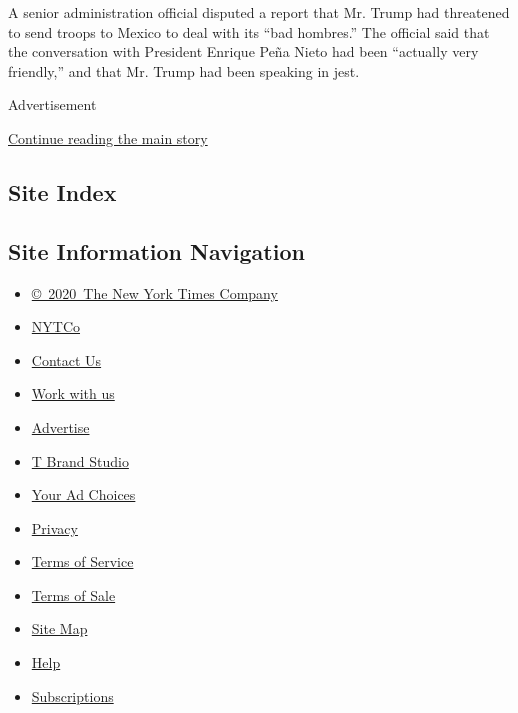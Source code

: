 A senior administration official disputed a report that Mr. Trump had
threatened to send troops to Mexico to deal with its ``bad hombres.''
The official said that the conversation with President Enrique Peña
Nieto had been ``actually very friendly,'' and that Mr. Trump had been
speaking in jest.

Advertisement

\protect\hyperlink{after-bottom}{Continue reading the main story}

\hypertarget{site-index}{%
\subsection{Site Index}\label{site-index}}

\hypertarget{site-information-navigation}{%
\subsection{Site Information
Navigation}\label{site-information-navigation}}

\begin{itemize}
\tightlist
\item
  \href{https://help.nytimes.com/hc/en-us/articles/115014792127-Copyright-notice}{©~2020~The
  New York Times Company}
\end{itemize}

\begin{itemize}
\tightlist
\item
  \href{https://www.nytco.com/}{NYTCo}
\item
  \href{https://help.nytimes.com/hc/en-us/articles/115015385887-Contact-Us}{Contact
  Us}
\item
  \href{https://www.nytco.com/careers/}{Work with us}
\item
  \href{https://nytmediakit.com/}{Advertise}
\item
  \href{http://www.tbrandstudio.com/}{T Brand Studio}
\item
  \href{https://www.nytimes.com/privacy/cookie-policy\#how-do-i-manage-trackers}{Your
  Ad Choices}
\item
  \href{https://www.nytimes.com/privacy}{Privacy}
\item
  \href{https://help.nytimes.com/hc/en-us/articles/115014893428-Terms-of-service}{Terms
  of Service}
\item
  \href{https://help.nytimes.com/hc/en-us/articles/115014893968-Terms-of-sale}{Terms
  of Sale}
\item
  \href{https://spiderbites.nytimes.com}{Site Map}
\item
  \href{https://help.nytimes.com/hc/en-us}{Help}
\item
  \href{https://www.nytimes.com/subscription?campaignId=37WXW}{Subscriptions}
\end{itemize}
